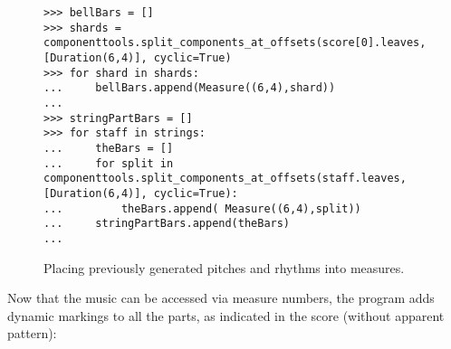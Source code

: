 \begin{figure}[H] 
\begin{lstlisting}[basicstyle=\scriptsize\ttfamily, breaklines=True, tabsize=4, showtabs=false, showspaces=false]
>>> bellBars = []
>>> shards = componenttools.split_components_at_offsets(score[0].leaves, [Duration(6,4)], cyclic=True)
>>> for shard in shards:
... 	bellBars.append(Measure((6,4),shard))
... 
>>> stringPartBars = []
>>> for staff in strings:
... 	theBars = []
... 	for split in componenttools.split_components_at_offsets(staff.leaves, [Duration(6,4)], cyclic=True):
... 		theBars.append( Measure((6,4),split))
... 	stringPartBars.append(theBars)
... \end{lstlisting}

\caption{Placing previously generated pitches and rhythms into measures. } 
\end{figure}

Now that the music can be accessed via measure numbers, the program adds dynamic markings to all the parts, as indicated in the score (without apparent pattern):

